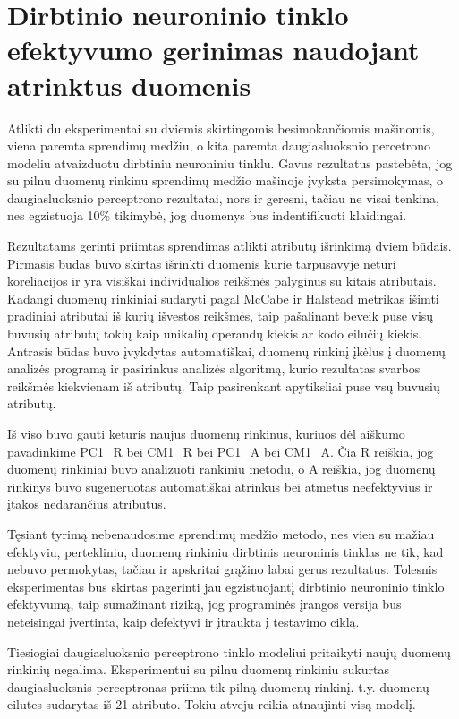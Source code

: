 \documentclass{VUMIFPSbakalaurinis}
\begin{document}
\section{Dirbtinio neuroninio tinklo efektyvumo gerinimas naudojant atrinktus duomenis}

Atlikti du eksperimentai su dviemis skirtingomis besimokančiomis mašinomis, viena paremta sprendimų medžiu, o kita paremta daugiasluoksnio percetrono modeliu atvaizduotu dirbtiniu neuroniniu tinklu. Gavus rezultatus pastebėta, jog su pilnu duomenų rinkinu sprendimų medžio mašinoje įvyksta persimokymas, o daugiasluoksnio perceptrono rezultatai, nors ir geresni, tačiau ne visai tenkina, nes egzistuoja 10\% tikimybė, jog duomenys bus indentifikuoti klaidingai.

Rezultatams gerinti priimtas sprendimas atlikti atributų išrinkimą dviem būdais. Pirmasis būdas buvo skirtas išrinkti duomenis kurie tarpusavyje neturi koreliacijos ir yra visiškai individualios reikšmės palyginus su kitais atributais. Kadangi duomenų rinkiniai sudaryti pagal McCabe ir Halstead metrikas išimti pradiniai atributai iš kurių išvestos reikšmės, taip pašalinant beveik puse visų buvusių atributų tokių kaip unikalių operandų kiekis ar kodo eilučių kiekis. Antrasis būdas buvo įvykdytas automatiškai, duomenų rinkinį įkėlus į duomenų analizės programą ir pasirinkus analizės algoritmą, kurio rezultatas svarbos reikšmės kiekvienam iš atributų. Taip pasirenkant apytiksliai puse vsų buvusių atributų.

Iš viso buvo gauti keturis naujus duomenų rinkinus, kuriuos dėl aiškumo pavadinkime PC1\_R bei CM1\_R bei PC1\_A bei CM1\_A. Čia R reiškia, jog duomenų rinkiniai buvo analizuoti rankiniu metodu, o A reiškia, jog duomenų rinkinys buvo sugeneruotas automatiškai atrinkus bei atmetus neefektyvius ir įtakos nedarančius atributus.

Tęsiant tyrimą nebenaudosime sprendimų medžio metodo, nes vien su mažiau efektyviu, pertekliniu, duomenų rinkiniu dirbtinis neuroninis tinklas ne tik, kad nebuvo permokytas, tačiau ir apskritai grąžino labai gerus rezultatus. Tolesnis eksperimentas bus skirtas pagerinti jau egzistuojantį dirbtinio neuroninio tinklo efektyvumą, taip sumažinant riziką, jog programinės įrangos versija bus neteisingai įvertinta, kaip defektyvi ir įtraukta į testavimo ciklą.

Tiesiogiai daugiasluoksnio perceptrono tinklo modeliui pritaikyti naujų duomenų rinkinių negalima. Eksperimentui su pilnu duomenų rinkiniu sukurtas daugiasluoksnis perceptronas priima tik pilną duomenų rinkinį. t.y. duomenų eilutes sudarytas iš 21 atributo. Tokiu atveju reikia atnaujinti visą modelį.
\end{document}
